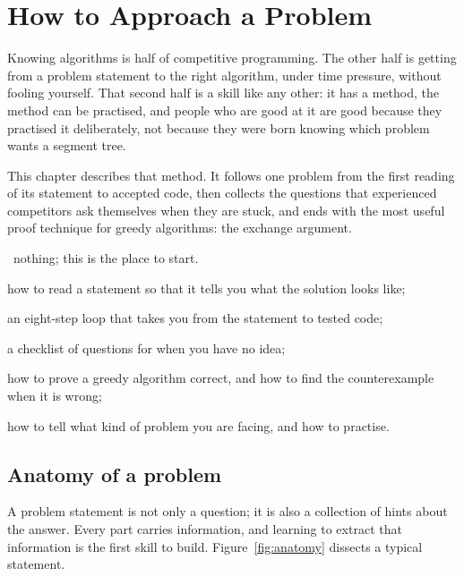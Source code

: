 \chapter{How to Approach a Problem}\label{ch:approach}

Knowing algorithms is half of competitive programming. The other half is getting from a problem statement to the right
algorithm, under time pressure, without fooling yourself. That second half is a skill like any other: it has a method, the
method can be practised, and people who are good at it are good because they practised it deliberately, not because they
were born knowing which problem wants a segment tree.

This chapter describes that method. It follows one problem from the first reading of its statement to accepted code, then
collects the questions that experienced competitors ask themselves when they are stuck, and ends with the most useful proof
technique for greedy algorithms: the exchange argument.

\begin{chapterintro}{\bronze\ \silver}{nothing; this is the place to start.}
  \item how to read a statement so that it tells you what the solution looks like;
  \item an eight-step loop that takes you from the statement to tested code;
  \item a checklist of questions for when you have no idea;
  \item how to prove a greedy algorithm correct, and how to find the counterexample when it is wrong;
  \item how to tell what kind of problem you are facing, and how to practise.
\end{chapterintro}

\section[Anatomy of a problem]{Anatomy of a problem \hfill \bronze}\label{sec:anatomy}

A problem statement is not only a question; it is also a collection of hints about the answer. Every part carries
information, and learning to extract that information is the first skill to build. Figure~\ref{fig:anatomy} dissects a
typical statement.

